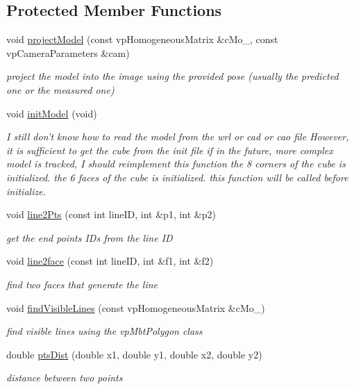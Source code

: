 \subsection*{\-Protected \-Member \-Functions}
\begin{DoxyCompactItemize}
\item 
void \hyperlink{classcadModel_a7e453663fe4537bd63e61756ff8c83a5}{project\-Model} (const vp\-Homogeneous\-Matrix \&c\-Mo\-\_\-, const vp\-Camera\-Parameters \&cam)
\begin{DoxyCompactList}\small\item\em project the model into the image using the provided pose (usually the predicted one or the measured one) \end{DoxyCompactList}\item 
void \hyperlink{classcadModel_a973bb41637e70201c993643924d1b196}{init\-Model} (void)
\begin{DoxyCompactList}\small\item\em \-I still don't know how to read the model from the wrl or cad or cao file \-However, it is sufficient to get the cube from the init file if in the future, more complex model is tracked, \-I should reimplement this function the 8 corners of the cube is initialized. the 6 faces of the cube is initialized. this function will be called before initialize. \end{DoxyCompactList}\item 
void \hyperlink{classcadModel_a7722bb4d6e81af14e5a9a445e267c9e2}{line2\-Pts} (const int line\-I\-D, int \&p1, int \&p2)
\begin{DoxyCompactList}\small\item\em get the end points \-I\-Ds from the line \-I\-D \end{DoxyCompactList}\item 
void \hyperlink{classcadModel_acde0cfd7b7d6e41c7092ca98a9293aa0}{line2face} (const int line\-I\-D, int \&f1, int \&f2)
\begin{DoxyCompactList}\small\item\em find two faces that generate the line \end{DoxyCompactList}\item 
void \hyperlink{classcadModel_ad7646d304fde140292bb2453ffdb1aab}{find\-Visible\-Lines} (const vp\-Homogeneous\-Matrix \&c\-Mo\-\_\-)
\begin{DoxyCompactList}\small\item\em find visible lines using the vp\-Mbt\-Polygon class \end{DoxyCompactList}\item 
double \hyperlink{classcadModel_a6c2041e2fe2632256581676514e737b8}{pts\-Dist} (double x1, double y1, double x2, double y2)
\begin{DoxyCompactList}\small\item\em distance between two points \end{DoxyCompactList}\end{DoxyCompactItemize}
